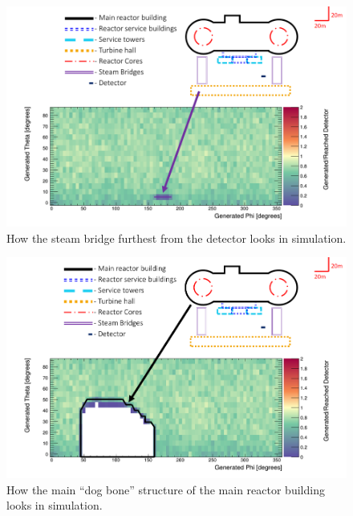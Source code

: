 \newpage
\begin{figure}[htbp]
  \centering
  \begin{turn}{-90}
  \begin{minipage}{9in}
  \centering
    \includegraphics[scale = 0.8]{Chapter5/Figs/wylfaRasterNew/steamBridgeFarGen_Reached.png}
  \caption{How the steam bridge furthest from the detector looks in simulation.}
  \label{fig:steamBridgeFarGen_Reached}
  \end{minipage}
  \end{turn}
\end{figure}


\newpage
\begin{figure}[htbp]
  \centering
  \begin{turn}{-90}
  \begin{minipage}{9in}
  \centering
    \includegraphics[scale = 0.8]{Chapter5/Figs/wylfaRasterNew/dogBoneGen_Reached.png}
  \caption{How the main ``dog bone'' structure of the main reactor building looks in simulation.}
  \label{fig:dogBoneGen_Reached}
  \end{minipage}
  \end{turn}
\end{figure}

